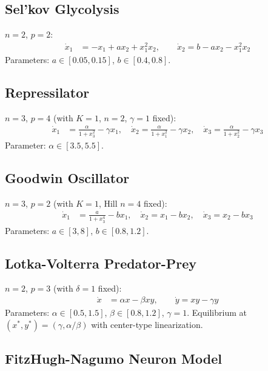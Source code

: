\documentclass[11pt]{article}
\begin{document}
\subsection{Sel'kov Glycolysis}

$n=2$, $p=2$:
\begin{align*}
\dot{x}_1 &= -x_1 + ax_2 + x_1^2 x_2, \qquad
\dot{x}_2 = b - ax_2 - x_1^2 x_2
\end{align*}
Parameters: $a \in [0.05, 0.15]$, $b \in [0.4, 0.8]$.

\subsection{Repressilator~\cite{elowitz2000repressilator}}

$n=3$, $p=4$ (with $K{=}1$, $n{=}2$, $\gamma{=}1$ fixed):
\begin{align*}
\dot{x}_1 &= \frac{\alpha}{1 + x_3^2} - \gamma x_1, \quad
\dot{x}_2 = \frac{\alpha}{1 + x_1^2} - \gamma x_2, \quad
\dot{x}_3 = \frac{\alpha}{1 + x_2^2} - \gamma x_3
\end{align*}
Parameter: $\alpha \in [3.5, 5.5]$.

\subsection{Goodwin Oscillator~\cite{goodwin1965oscillatory}}

$n=3$, $p=2$ (with $K{=}1$, Hill $n{=}4$ fixed):
\begin{align*}
\dot{x}_1 &= \frac{a}{1 + x_3^4} - bx_1, \quad
\dot{x}_2 = x_1 - bx_2, \quad
\dot{x}_3 = x_2 - bx_3
\end{align*}
Parameters: $a \in [3, 8]$, $b \in [0.8, 1.2]$.

\subsection{Lotka-Volterra Predator-Prey}

$n=2$, $p=3$ (with $\delta{=}1$ fixed):
\begin{align*}
\dot{x} &= \alpha x - \beta x y, \qquad
\dot{y} = xy - \gamma y
\end{align*}
Parameters: $\alpha \in [0.5, 1.5]$, $\beta \in [0.8, 1.2]$, $\gamma = 1$.
Equilibrium at $(x^*, y^*) = (\gamma, \alpha/\beta)$ with center-type linearization.

\subsection{FitzHugh-Nagumo Neuron Model}
\end{document}
